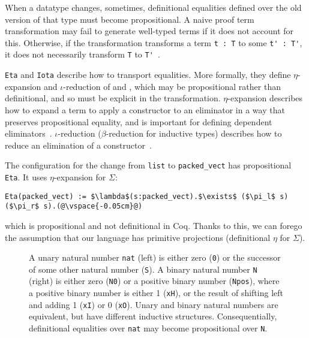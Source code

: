 When a datatype changes, sometimes, definitional equalities defined over the old version of that type must become propositional.
A naive proof term transformation may fail to generate well-typed terms if it does not account for this.
Otherwise, if the transformation transforms a term \lstinline{t : T} to some \lstinline{t' : T'}, it does not necessarily
transform \lstinline{T} to \lstinline{T'}~\cite{tabareau2019marriage}.

\lstinline{Eta} and \lstinline{Iota} describe how to transport equalities.
More formally, they define $\eta$-expansion and $\iota$-reduction of \A and \B,
which may be propositional rather than definitional,
and so must be explicit in the transformation.
$\eta$-expansion describes how to expand a term to apply a constructor to an eliminator in a way that preserves propositional equality,
and is important for defining dependent eliminators~\cite{nlab:eta-conversion}.
$\iota$-reduction ($\beta$-reduction for inductive types) describes how to reduce an elimination of a constructor~\cite{nlab:beta-reduction}.

The configuration for the change from \lstinline{list} to \lstinline{packed_vect} has propositional \lstinline{Eta}.
It uses $\eta$-expansion for $\Sigma$:

\begin{lstlisting}
Eta(packed_vect) := $\lambda$(s:packed_vect).$\exists$ ($\pi_l$ s) ($\pi_r$ s).(@\vspace{-0.05cm}@)
\end{lstlisting}
which is propositional and not definitional in Coq.
Thanks to this, we can forego the assumption that our language has primitive projections (definitional $\eta$ for $\Sigma$).

\begin{figure}
\begin{minipage}{0.44\columnwidth}
   
\end{minipage}
\hfill
\begin{minipage}{0.54\columnwidth}
   
\end{minipage}
\vspace{-0.2cm}
\caption{A unary natural number \lstinline{nat} (left) is either zero (\lstinline{0}) or the successor of some other natural number (\lstinline{S}).
A binary natural number \lstinline{N} (right) is either zero (\lstinline{N0}) or a positive binary number (\lstinline{Npos}), where a positive binary number is either 1 (\lstinline{xH}), or the result of shifting left and adding 1 (\lstinline{xI}) or
0 (\lstinline{xO}). Unary and binary natural numbers are equivalent, but have different inductive structures.
Consequentially, definitional equalities over \lstinline{nat} may become propositional over \lstinline{N}.}
\vspace{-0.2cm}
\label{fig:nattobin}
\end{figure}

